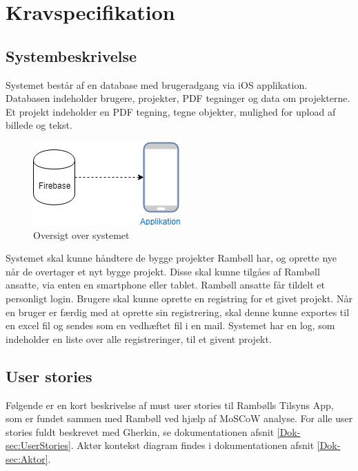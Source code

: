 	\chapter{Kravspecifikation}
	
			\section{Systembeskrivelse}
		Systemet består af en database med brugeradgang via iOS applikation.
		Databasen indeholder brugere, projekter, PDF tegninger og data om projekterne.
		Et projekt indeholder en PDF tegning, tegne objekter, mulighed for upload af billede og tekst.
		
		\begin{figure}[H]
			\centering
			\includegraphics[width=0.4\linewidth]{Kravspecifikation/Oversigtoversystem}
			\caption{Oversigt over systemet}
			\label{fig:OversigtSystembeskrivelse}
		\end{figure}
		
		Systemet skal kunne håndtere de bygge projekter Rambøll har, og oprette nye når de overtager et nyt bygge projekt.
		Disse skal kunne tilgåes af Rambøll ansatte, via enten en smartphone eller tablet.
		Rambøll ansatte får tildelt et personligt login.
		Brugere skal kunne oprette en registring for et givet projekt.
		Når en bruger er færdig med at oprette sin registrering, skal denne kunne exportes til en excel fil og sendes som en vedhæftet fil i en mail.
		Systemet har en log, som indeholder en liste over alle registreringer, til et givent projekt. \\	
				
		\clearpage

	
	\section{User stories} 
	Følgende er en kort beskrivelse af must user stories til Rambølls Tilsyns App, som er fundet sammen med Rambøll ved hjælp af MoSCoW analyse. \cite{MoSCoW} For alle user stories fuldt beskrevet med Gherkin, se dokumentationen afsnit \vref{Dok-sec:UserStories}.
	Aktør kontekst diagram findes i dokumentationen afsnit \vref{Dok-sec:Aktor}.

